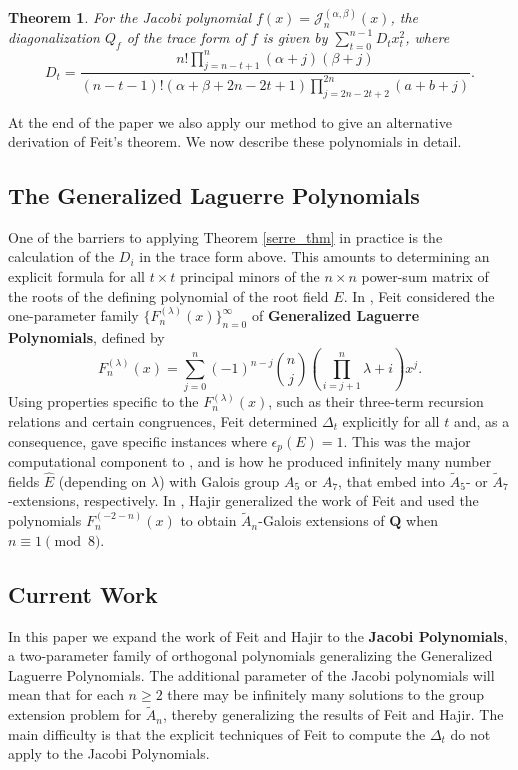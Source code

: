 \documentclass{amsart}
\newcommand{\Q}{\mathbf{Q}}
\theoremstyle{plain}
\newtheorem{thm}[equation]{Theorem}
\theoremstyle{remark}
\begin{document}
\begin{thm} \label{explicit_diag}
For the Jacobi polynomial $f(x) = \mathscr{J}^{(\alpha, \beta)}_n(x)$, the diagonalization $Q_f$ of the trace form of $f$ is given by $\sum_{t=0}^{n-1} D_t x_t^2$, where
\[
D_t = \frac{n! \prod_{j=n-t+1}^n (\alpha + j)(\beta+j)}{(n-t-1)! (\alpha + \beta + 2n-2t+1) \prod_{j=2n-2t+2}^{2n}(a+b+j)}.
\]
\end{thm}

At the end of the paper we also apply our method to give an alternative derivation of Feit's theorem.   We now describe these polynomials in detail.

\subsection{The Generalized Laguerre Polynomials} One of the barriers to applying Theorem \ref{serre_thm} in practice is the calculation of the $D_i$ in the trace form above.  This amounts to determining an explicit formula for all $t \times t$ principal minors of the $n \times n$ power-sum matrix of the roots of the defining polynomial of the root field $E$.  In \cite{feit}, Feit considered the one-parameter family $\lbrace F_n^{(\lambda)}(x)\rbrace_{n=0}^\infty$ of \textbf{Generalized Laguerre Polynomials}, defined by
\[
F_n^{(\lambda)}(x) = \sum_{j=0}^n (-1)^{n-j} \binom{n}{j} \left(\prod_{i=j+1}^n \lambda + i \right)x^j.
\]
Using properties specific to the $F_n^{(\lambda)}(x)$, such as their three-term recursion relations and certain congruences, Feit determined $\Delta_{t}$ explicitly for all $t$ and, as a consequence, gave specific instances where $\epsilon_p(E) = 1$.   This was the major computational component to \cite{feit}, and is how he produced infinitely many number fields $\widehat{E}$ (depending on $\lambda$) with Galois group $A_5$ or $A_7$, that embed into $\widetilde{A}_5$- or $\widetilde{A}_7$-extensions, respectively.  In \cite{hajir}, Hajir generalized the work of Feit and used the polynomials $F_n^{(-2-n)}(x)$ to obtain $\widetilde{A}_n$-Galois extensions of $\Q$ when $n \equiv 1 \pmod{8}$. 

\subsection{Current Work} In this paper we expand the work of Feit and Hajir to the \textbf{Jacobi Polynomials}, a two-parameter family of orthogonal polynomials generalizing the Generalized Laguerre Polynomials.  The additional parameter of the Jacobi polynomials will mean that for each $n \geq 2$ there may be infinitely many solutions to the group extension problem for $\widetilde{A}_n$, thereby generalizing the results of Feit and Hajir. The main difficulty is that the explicit techniques of Feit to compute the $\Delta_t$ do not apply to the Jacobi Polynomials.  
\end{document}
